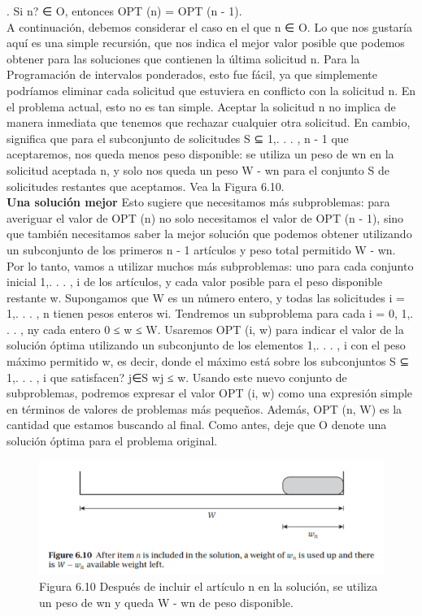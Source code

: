 \documentclass[a4paper]{article}
\begin{document}
. Si n? ∈ O, entonces OPT (n) = OPT (n - 1).\\

A continuación, debemos considerar el caso en el que n ∈ O. Lo que nos gustaría aquí es una simple recursión, que nos indica el mejor valor posible que podemos obtener para las soluciones que contienen la última solicitud n. Para la Programación de intervalos ponderados, esto fue fácil, ya que simplemente podríamos eliminar cada solicitud que estuviera en conflicto con la solicitud n. En el problema actual, esto no es tan simple. Aceptar la solicitud n no implica de manera inmediata que tenemos que rechazar cualquier otra solicitud. En cambio, significa que para el subconjunto de solicitudes S ⊆ {1,. . . , n - 1} que aceptaremos, nos queda menos peso disponible: se utiliza un peso de wn en la solicitud aceptada n, y solo nos queda un peso W - wn para el conjunto S de solicitudes restantes que aceptamos. Vea la Figura 6.10.\\

\textbf{Una solución mejor} Esto sugiere que necesitamos más subproblemas: para averiguar el valor de OPT (n) no solo necesitamos el valor de OPT (n - 1), sino que también necesitamos saber la mejor solución que podemos obtener utilizando un subconjunto de los primeros n - 1 artículos y peso total permitido W - wn. Por lo tanto, vamos a utilizar muchos más subproblemas: uno para cada conjunto inicial {1,. . . , i} de los artículos, y cada valor posible para el peso disponible restante w. Supongamos que W es un número entero, y todas las solicitudes i = 1,. . . , n tienen pesos enteros wi. Tendremos un subproblema para cada i = 0, 1,. . . , ny cada entero 0 ≤ w ≤ W. Usaremos OPT (i, w) para indicar el valor de la solución óptima utilizando un subconjunto de los elementos {1,. . . , i} con el peso máximo permitido w, es decir, donde el máximo está sobre los subconjuntos S ⊆ {1,. . . , i} que satisfacen? j∈S wj ≤ w. Usando este nuevo conjunto de subproblemas, podremos expresar el valor OPT (i, w) como una expresión simple en términos de valores de problemas más pequeños. Además, OPT (n, W) es la cantidad que estamos buscando al final. Como antes, deje que O denote una solución óptima para el problema original.\\


\begin{figure}[h]
\centering
\includegraphics[scale=1]{Imagenes-Seccion6/fig6_10.PNG}
\caption{Figura 6.10 Después de incluir el artículo n en la solución, se utiliza un peso de wn y queda W - wn de peso disponible.}
\end{figure}
\end{document}
